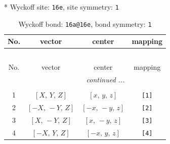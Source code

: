 \documentclass[fleqn,8pt]{jsarticle}
\begin{document}
* Wyckoff site: {\tt 16e}, site symmetry: {\tt 1}
\renewcommand{\arraystretch}{1.2}
\begin{longtable}{cccc}
\caption{Wyckoff bond: {\tt 16a@16e}, bond symmetry: {\tt 1}}
 \\
 \hline \hline
No. & vector & center & mapping \\ \hline \endfirsthead

\multicolumn{3}{l}{\tablename\ \thetable{}} \\
 \hline \hline
No. & vector & center & mapping \\ \hline \endhead

 \hline \hline
\multicolumn{3}{r}{\footnotesize\it continued ...} \\ \endfoot

 \hline \hline
\multicolumn{3}{r}{} \\ \endlastfoot

1 & $\left[ X,\, Y,\, Z \right]$ & $\left[ x,\, y,\, z \right]$ & {\tt [1]} \\ \hline
2 & $\left[ - X,\, - Y,\, Z \right]$ & $\left[ - x,\, - y,\, z \right]$ & {\tt [2]} \\ \hline
3 & $\left[ X,\, - Y,\, Z \right]$ & $\left[ x,\, - y,\, z \right]$ & {\tt [3]} \\ \hline
4 & $\left[ - X,\, Y,\, Z \right]$ & $\left[ - x,\, y,\, z \right]$ & {\tt [4]} \\
\end{longtable}
\end{document}
